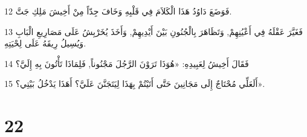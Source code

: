 \par 12 فَوَضَعَ دَاوُدُ هَذَا الْكَلاَمَ فِي قَلْبِهِ وَخَافَ جِدّاً مِنْ أَخِيشَ مَلِكِ جَتَّ.
\par 13 فَغَيَّرَ عَقْلَهُ فِي أَعْيُنِهِمْ, وَتَظَاهَرَ بِالْجُنُونِ بَيْنَ أَيْدِيهِمْ, وَأَخَذَ يُخَرْبِشُ عَلَى مَصَارِيعِ الْبَابِ وَيُسِيلُ رِيقَهُ عَلَى لِحْيَتِهِ.
\par 14 فَقَالَ أَخِيشُ لِعَبِيدِهِ: «هُوَذَا تَرَوْنَ الرَّجُلَ مَجْنُوناً, فَلِمَاذَا تَأْتُونَ بِهِ إِلَيَّ؟
\par 15 أَلَعَلِّي مُحْتَاجٌ إِلَى مَجَانِينَ حَتَّى أَتَيْتُمْ بِهَذَا لِيَتَجَنَّنَ عَلَيَّ؟ أَهَذَا يَدْخُلُ بَيْتِي؟».

\chapter{22}


